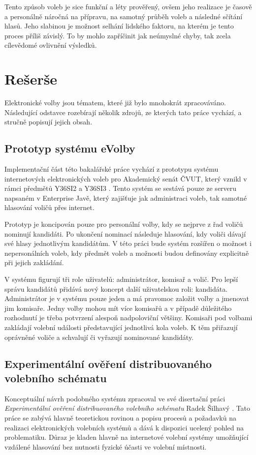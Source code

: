 \documentclass[11pt,twoside,a4paper]{book}
\begin{document}
Tento způsob voleb je sice funkční a léty prověřený, ovšem jeho realizace je časově a personálně náročná na přípravu, na samotný průběh voleb a následné sčítání hlasů. Jeho slabinou je možnost selhání lidského faktoru, na kterém je tento proces příliš závislý. To by mohlo zapříčinit jak neúmyslné chyby, tak zcela cílevědomé ovlivnění výsledků.

\section{Rešerše} 

Elektronické volby jsou tématem, které již bylo mnohokrát zpracováváno. Následující odstavce rozebírají několik zdrojů, ze kterých tato práce vychází, a stručně popisují jejich obsah.

\subsection{Prototyp systému eVolby}

Implementační část této bakalářské práce vychází z prototypu systému internetových elektronických voleb pro Akademický senát ČVUT, který vznikl v rámci předmětů Y36SI2 a Y36SI3 \cite{www:prototyp}. Tento systém se sestává pouze ze serveru napsaném v Enterprise Javě, který zajišťuje jak administraci voleb, tak samotné hlasování voličů přes internet. 

Prototyp je koncipován pouze pro personální volby, kdy se nejprve z řad voličů nominují kandidáti. Po ukončení nominací následuje hlasování, kdy voliči dávají své hlasy jednotlivým kandidátům. V této práci bude systém rozšířen o možnost i nepersonálních voleb, kdy předmět voleb a možnosti budou definovány explicitně při jejich zakládání.

V systému figurují tři role uživatelů: administrátor, komisař a volič. Pro lepší správu kandidátů přidává nový koncept další uživatelskou roli: kandidáta. Administrátor je v systému pouze jeden a má pravomoc založit volby a jmenovat jim komisaře. Jedny volby mohou mít více komisařů a v případě důležitého rozhodnutí je třeba potvrzení alespoň nadpoloviční většiny. Komisaři pod volbami zakládají volební události představující jednotlivá kola voleb. K těm přiřazují oprávněné voliče a schvalují či vyřazují nominované kandidáty.

\subsection{Experimentální ověření distribuovaného volebního schématu}
Konceptuální návrh podobného systému zpracoval ve své disertační práci \textit{Experimentální ověření distribuovaného
volebního schématu} Radek Šilhavý \cite{art:silhavy}. Tato práce se zabývá hlavně teoretickou rovinou a popisu procesů a požadavků na realizaci elektronických volebních systémů a dává k dispozici ucelený pohled na problematiku. Důraz je kladen hlavně na internetové volební systémy umožňující vzdálené hlasování bez nutnosti fyzické účasti ve volební místnosti.
\end{document}
